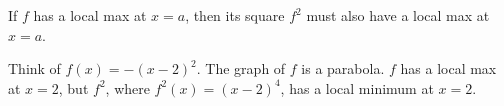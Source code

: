 \documentclass{ximera}
\author{Steven Gubkin\and Nela Lakos}
\begin{document}
\begin{exercise}

	If $f$ has a local max at $x=a$, then its square $f^2$ must also have a local max at $x=a$.
	\begin{hint}
	Think of $f(x)=-(x-2)^2$. The graph of $f$ is a parabola.  $f$ has a local max at $x=2$, but   $f^2$, where $f^2(x)=(x-2)^4$, has a local minimum at $x=2$. 
	\end{hint}
	\begin{multipleChoice}	
	\end{multipleChoice}

\end{exercise}
\end{document}
